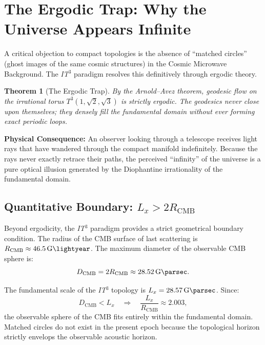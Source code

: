 \documentclass[12pt, a4paper]{article}
\newtheorem{theorem}{Theorem}
\newcommand{\ITthree}{\textit{IT}\ensuremath{^3}}
\newcommand{\Tthree}{\ensuremath{T^3(1,\sqrt{2},\sqrt{3})}}
\newcommand{\Lx}{\ensuremath{L_x}}
\begin{document}
\section{The Ergodic Trap: Why the Universe Appears Infinite}
\label{sec:ergodic}

A critical objection to compact topologies is the absence of ``matched circles'' (ghost images of the same cosmic structures) in the Cosmic Microwave Background. The \ITthree{} paradigm resolves this definitively through ergodic theory.

\begin{theorem}[The Ergodic Trap]
  By the Arnold--Avez theorem, geodesic flow on the irrational torus \Tthree{} is strictly ergodic. The geodesics never close upon themselves; they densely fill the fundamental domain without ever forming exact periodic loops.
\end{theorem}

\textbf{Physical Consequence:} An observer looking through a telescope receives light rays that have wandered through the compact manifold indefinitely. Because the rays never exactly retrace their paths, the perceived ``infinity'' of the universe is a pure optical illusion generated by the Diophantine irrationality of the fundamental domain.

\subsection{Quantitative Boundary: $L_x > 2R_{\text{CMB}}$}
\label{subsec:circles}

Beyond ergodicity, the \ITthree{} paradigm provides a strict geometrical boundary condition. The radius of the CMB surface of last scattering is $R_{\text{CMB}} \approx \SI{46.5}{\giga\lightyear}$. The maximum diameter of the observable CMB sphere is:
\begin{equation}
  D_{\text{CMB}} = 2 R_{\text{CMB}} \approx \SI{28.52}{\giga\parsec}.
\end{equation}

The fundamental scale of the \ITthree{} topology is $\Lx = \SI{28.57}{\giga\parsec}$. Since:
\begin{equation}
  D_{\text{CMB}} < L_x \quad \Rightarrow \quad \frac{L_x}{R_{\text{CMB}}} \approx 2.003,
  \label{eq:circle_condition}
\end{equation}
the observable sphere of the CMB fits entirely within the fundamental domain. Matched circles do not exist in the present epoch because the topological horizon strictly envelops the observable acoustic horizon.
\end{document}
